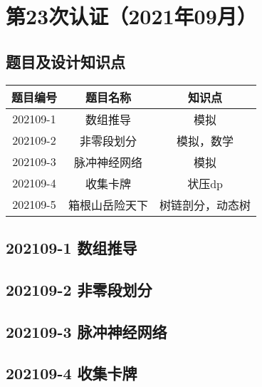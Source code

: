 \documentclass[cn,10pt,math=newtx,citestyle=gb7714-2015,bibstyle=gb7714-2015]{elegantbook}
\newif\ifonlyanalyze %
\begin{document}

\chapter{第23次认证（2021年09月）}

\section{题目及设计知识点}

\begin{table}[htbp]
  \centering
  \begin{tabular}{ccc}
    \toprule
    题目编号 & 题目名称       & 知识点           \\
    \midrule
    202109-1 & 数组推导       & 模拟             \\
    202109-2 & 非零段划分     & 模拟，数学       \\
    202109-3 & 脉冲神经网络   & 模拟             \\
    202109-4 & 收集卡牌       & 状压dp           \\
    202109-5 & 箱根山岳险天下 & 树链剖分，动态树 \\
    \bottomrule
  \end{tabular}
\end{table}

\newpage
\section{202109-1 数组推导}
\ifonlyanalyze
\else
  
\fi


\newpage
\section{202109-2 非零段划分}
\ifonlyanalyze
\else
  
\fi


\newpage
\section{202109-3 脉冲神经网络}
\ifonlyanalyze
\else
  
\fi


\newpage
\section{202109-4 收集卡牌}
\ifonlyanalyze
\else
  
\fi

\end{document}
